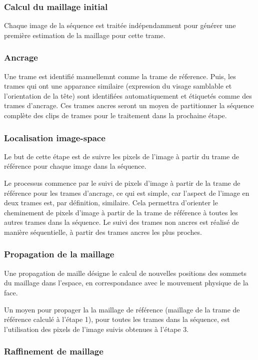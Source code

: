 \documentclass[a4paper,10pt]{article}
\begin{document}
\subsubsection{Calcul du maillage initial}
Chaque image de la séquence est traitée indépendamment pour générer une première estimation de la maillage pour cette trame.

\subsubsection{Ancrage}
Une trame est identifié manuellemnt comme la trame de réference. Puis, les trames qui ont une apparance similaire (expression du visage samblable et l'orientation de la tête) sont identifiées automatiquement et étiquetés comme des trames d'ancrage. Ces trames ancres seront un moyen de partitionner la séquence complète des clips de trames pour le traitement dans la prochaine étape.

\subsubsection{Localisation image-space}
Le but de cette étape est de suivre les pixels de l'image à partir du trame de référence pour chaque image dans la séquence. 

Le processus commence par le suivi de pixels d'image à partir de la trame de référence pour les trames d'ancrage, ce qui est simple, car l'aspect de l'image en deux trames est, par définition, similaire. Cela permettra d'orienter le cheminement de pixels d'image à partir de la trame de référence à toutes les autres trames dans la séquence. 
Le suivi des trames non ancres est réalisé de manière séquentielle, à partir des trames ancres les plus proches.

\subsubsection{Propagation de la maillage}

Une propagation de maille désigne le calcul de nouvelles positions des sommets du maillage dans l'espace, en correspondance avec le mouvement physique de la face.

Un moyen pour propager la la maillage de référence (maillage de la trame de référence calculé à l'étape 1), pour toutes les trames dans la séquence, est l'utilisation des pixels de l'image suivis obtenues à l'étape 3.
 
\subsubsection{Raffinement de maillage}
\end{document}
